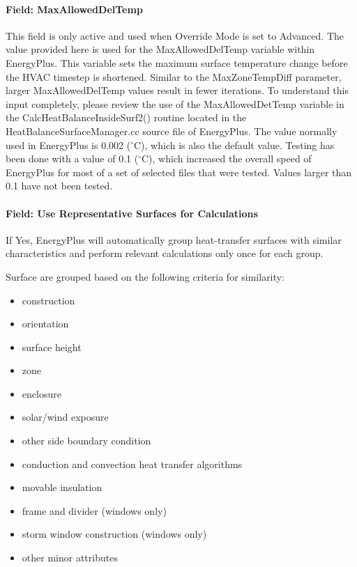 \paragraph{Field: MaxAllowedDelTemp}\label{max-allowed-del-temp}

This field is only active and used when Override Mode is set to Advanced. The value provided here is used for the MaxAllowedDelTemp variable within EnergyPlus. This variable sets the maximum surface temperature change before the HVAC timestep is shortened. Similar to the MaxZoneTempDiff parameter, larger MaxAllowedDelTemp values result in fewer iterations. To understand this input completely, please review the use of the MaxAllowedDetTemp variable in the CalcHeatBalanceInsideSurf2() routine located in the HeatBalanceSurfaceManager.cc source file of EnergyPlus. The value normally used in EnergyPlus is 0.002 ($^\circ$C), which is also the default value. Testing has been done with a value of 0.1 ($^\circ$C), which increased the overall speed of EnergyPlus for most of a set of selected files that were tested. Values larger than 0.1 have not been tested.

\paragraph{Field: Use Representative Surfaces for Calculations}\label{use-representative-surfaces-for-calculations}

If Yes, EnergyPlus will automatically group heat-transfer surfaces with similar characteristics and perform relevant calculations only once for each group.

Surface are grouped based on the following criteria for similarity:

\begin{itemize}
    \item construction
    \item orientation
    \item surface height
    \item zone
    \item enclosure
    \item solar/wind exposure
    \item other side boundary condition
    \item conduction and convection heat transfer algorithms
    \item movable insulation
    \item frame and divider (windows only)
    \item storm window construction (windows only)
    \item other minor attributes
\end{itemize}

